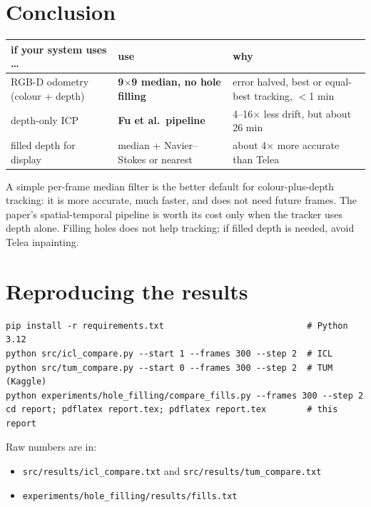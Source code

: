 \documentclass[11pt,a4paper]{article}
\begin{document}
\section{Conclusion}

\begin{table}[h]
\centering\small
\begin{tabular}{@{}L{3.6cm}L{4.9cm}L{6.6cm}@{}}
\toprule
if your system uses \dots & use & why \\
\midrule
RGB-D odometry (colour + depth) & \textcolor{ours}{\textbf{9$\times$9 median, no hole filling}} & error halved, best or equal-best tracking, $<$1 min \\
depth-only ICP & \textcolor{paper}{\textbf{Fu et al.\ pipeline}} & 4--16$\times$ less drift, but about 26 min \\
filled depth for display & median + Navier--Stokes or nearest & about 4$\times$ more accurate than Telea \\
\bottomrule
\end{tabular}
\end{table}

\noindent
A simple per-frame median filter is the better default for colour-plus-depth tracking: it is more accurate, much
faster, and does not need future frames. The paper's spatial-temporal pipeline is worth its cost only when the
tracker uses depth alone. Filling holes does not help tracking; if filled depth is needed, avoid Telea inpainting.

\section*{Reproducing the results}
\small
\begin{verbatim}
pip install -r requirements.txt                            # Python 3.12
python src/icl_compare.py --start 1 --frames 300 --step 2  # ICL
python src/tum_compare.py --start 0 --frames 300 --step 2  # TUM (Kaggle)
python experiments/hole_filling/compare_fills.py --frames 300 --step 2
cd report; pdflatex report.tex; pdflatex report.tex        # this report
\end{verbatim}
\normalsize
Raw numbers are in:
\begin{itemize}
  \item \texttt{src/results/icl\_compare.txt} and \texttt{src/results/tum\_compare.txt}
  \item \texttt{experiments/hole\_filling/results/fills.txt}
\end{itemize}
\end{document}
